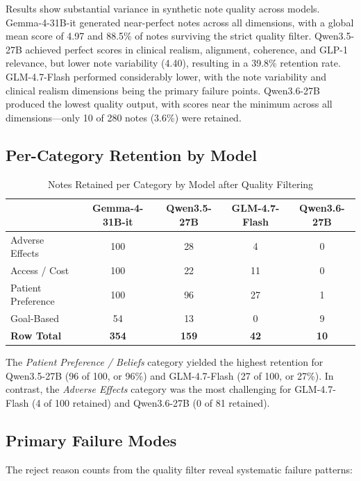 \documentclass[11pt, a4paper]{article}
\begin{document}
Results show substantial variance in synthetic note quality across models. Gemma-4-31B-it generated near-perfect notes across all dimensions, with a global mean score of 4.97 and 88.5\% of notes surviving the strict quality filter. Qwen3.5-27B achieved perfect scores in clinical realism, alignment, coherence, and GLP-1 relevance, but lower note variability (4.40), resulting in a 39.8\% retention rate. GLM-4.7-Flash performed considerably lower, with the note variability and clinical realism dimensions being the primary failure points. Qwen3.6-27B produced the lowest quality output, with scores near the minimum across all dimensions---only 10 of 280 notes (3.6\%) were retained.

\subsection{Per-Category Retention by Model}

\begin{table}[H]
\centering
\caption{Notes Retained per Category by Model after Quality Filtering}
\label{tab:per_category_retain}
\setlength{\tabcolsep}{4pt}
\begin{tabular}{lcccc}
\toprule
 & \textbf{Gemma-4-31B-it} & \textbf{Qwen3.5-27B} & \textbf{GLM-4.7-Flash} & \textbf{Qwen3.6-27B} \\
\midrule
Adverse Effects & 100 & 28 & 4 & 0 \\
Access / Cost & 100 & 22 & 11 & 0 \\
Patient Preference & 100 & 96 & 27 & 1 \\
Goal-Based & 54 & 13 & 0 & 9 \\
\midrule
\textbf{Row Total} & \textbf{354} & \textbf{159} & \textbf{42} & \textbf{10} \\
\bottomrule
\end{tabular}
\end{table}

The \textit{Patient Preference / Beliefs} category yielded the highest retention for Qwen3.5-27B (96 of 100, or 96\%) and GLM-4.7-Flash (27 of 100, or 27\%). In contrast, the \textit{Adverse Effects} category was the most challenging for GLM-4.7-Flash (4 of 100 retained) and Qwen3.6-27B (0 of 81 retained).

\subsection{Primary Failure Modes}

The reject reason counts from the quality filter reveal systematic failure patterns:
\end{document}
